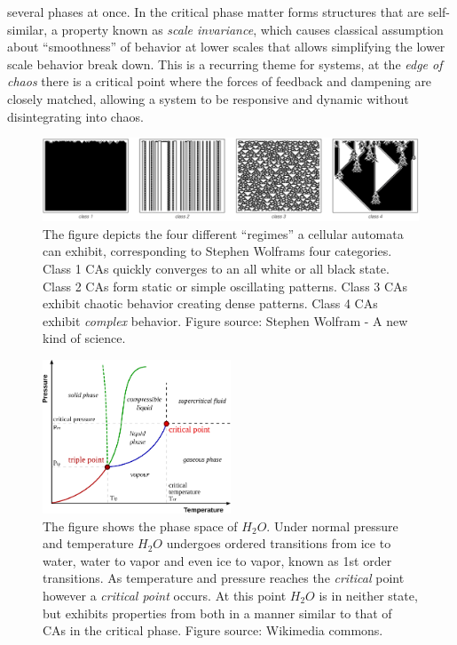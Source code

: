 several phases at once.
%
In the critical phase matter forms structures that are self-similar, a property
known as \emph{scale invariance}, which causes classical assumption about
``smoothness'' of behavior at lower scales that allows simplifying the lower
scale behavior break down.
%
This is a recurring theme for systems, at the \emph{edge of chaos} there is a
critical point where the forces of feedback and dampening are closely matched,
allowing a system to be responsive and dynamic without disintegrating into
chaos.
\begin{figure}[h!]
  \centering
  \includegraphics[width=1.0\textwidth]{fig/classesCA.png}
  \caption[The four classes of cellular automata]{
    The figure depicts the four different ``regimes'' a cellular automata can
    exhibit, corresponding to Stephen Wolframs four categories.
    Class 1 CAs quickly converges to an all white or all black state.
    Class 2 CAs form static or simple oscillating patterns.
    Class 3 CAs exhibit chaotic behavior creating dense patterns.
    Class 4 CAs exhibit \emph{complex} behavior.
    Figure source: Stephen Wolfram - A new kind of science.
  }
  \label{figCAPhase}
\end{figure}
\begin{figure}[h!]
  \centering
  \includegraphics[width=0.5\textwidth]{fig/Phase.png}
  \caption[Phase space of water]{ 
    The figure shows the phase space of $H_2O$.
    Under normal pressure and temperature $H_2O$ undergoes ordered transitions
    from ice to water, water to vapor and even ice to vapor, known as 1st order
    transitions.
    As temperature and pressure reaches the \emph{critical} point however a
    \emph{critical point} occurs. At this point $H_2O$ is in neither state, but
    exhibits properties from both in a manner similar to that of CAs in the
    critical phase. 
    Figure source: Wikimedia commons.
    }
  \label{figPhase}
\end{figure}
